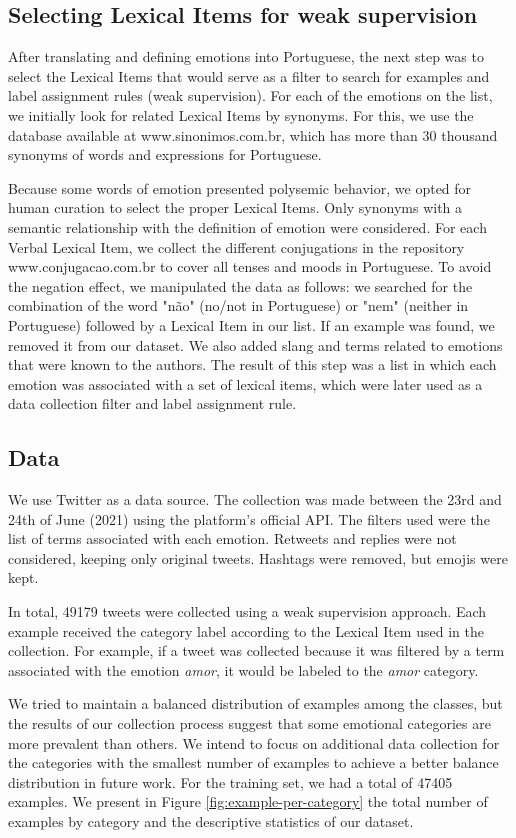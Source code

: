 \documentclass[12pt]{article}
\begin{document}
\subsection{Selecting Lexical Items for weak supervision }
After translating and defining emotions into Portuguese, the next step was to select the Lexical Items that would serve as a filter to search for examples and label assignment rules (weak supervision). For each of the emotions on the list, we initially look for related Lexical Items by synonyms. For this, we use the database available at www.sinonimos.com.br, which has more than 30 thousand synonyms of words and expressions for Portuguese.

Because some words of emotion presented polysemic behavior, we opted for human curation to select the proper Lexical Items. Only synonyms with a semantic relationship with the definition of emotion were considered. For each Verbal Lexical Item, we collect the different conjugations in the repository www.conjugacao.com.br to cover all tenses and moods in Portuguese. To avoid the negation effect, we manipulated the data as follows: we searched for the combination of the word "não" (no/not in Portuguese) or "nem" (neither in Portuguese) followed by a Lexical Item in our list. If an example was found, we removed it from our dataset. We also added slang and terms related to emotions that were known to the authors. The result of this step was a list in which each emotion was associated with a set of lexical items, which were later used as a data collection filter and label assignment rule.

\subsection{Data}

We use Twitter as a data source. The collection was made between the 23rd and 24th of June (2021) using the platform's official API. The filters used were the list of terms associated with each emotion. Retweets and replies were not considered, keeping only original tweets. Hashtags were removed, but emojis were kept.

In total, 49179 tweets were collected using a weak supervision approach. Each example received the category label according to the Lexical Item used in the collection. For example, if a tweet was collected because it was filtered by a term associated with the emotion \textit{amor}, it would be labeled to the \textit{amor} category.

We tried to maintain a balanced distribution of examples among the classes, but the results of our collection process suggest that some emotional categories are more prevalent than others. We intend to focus on additional data collection for the categories with the smallest number of examples to achieve a better balance distribution in future work. For the training set, we had a total of 47405 examples. We present in Figure \ref{fig:example-per-category} the total number of examples by category and the descriptive statistics of our dataset.
\end{document}
